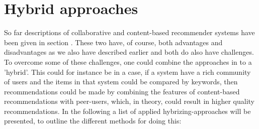 \section{Hybrid approaches}
So far descriptions of collaborative and content-based recommender systems have been given in section . These two have, of course, both advantages and disadvantages as we also have described earlier and both do also have challenges. To overcome some of these challenges, one could combine the approaches in to a 'hybrid'. This could for instance be in a case, if a system have a rich community of users and the items in that system could be compared by keywords, then recommendations could be made by combining the features of content-based recommendations with peer-users, which, in theory, could result in higher quality recommendations.
In the following a list of applied hybrizing-approaches will be presented, to outline the different methods for doing this:

